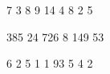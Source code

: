      \setcounter{row}{1}
        { }{7}{ }  {3}{ }{8}
        { }{9}{ }  {1}{4}{ }
        {4}{ }{8}  {2}{ }{5}

        {3}{8}{5}  { }{2}{4}
        {7}{2}{6}  {8}{ }{ }
        {1}{4}{9}  { }{5}{3}

        {6}{ }{2}  {5}{ }{1}
        { }{1}{ }  {9}{3}{ }
        { }{5}{ }  {4}{ }{2}